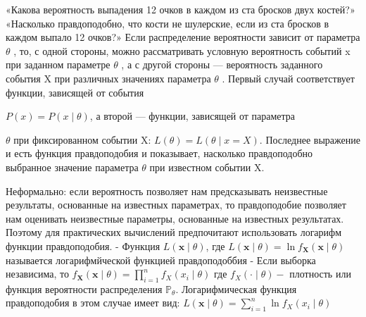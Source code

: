 \documentclass[a4paper, 12pt]{article}
\begin{document}
	«Какова вероятность выпадения 12 очков в каждом из ста бросков двух костей?»
	«Насколько правдоподобно, что кости не шулерские, если из ста бросков в каждом выпало 12 очков?»
	Если распределение вероятности зависит от параметра 
	$\theta$ , то, с одной стороны, можно рассматривать условную вероятность событий 
	x при заданном параметре
	$\theta$ , а с другой стороны — вероятность заданного события 
	X при различных значениях параметра 
	$\theta$ . Первый случай соответствует функции, зависящей от события 

$P(x)=P(x\mid \theta )$, а второй — функции, зависящей от параметра 

	$\theta$ при фиксированном событии X:
	$L(\theta )=L(\theta \mid x=X)$. Последнее выражение и есть функция правдоподобия и показывает, насколько правдоподобно выбранное значение параметра 
	$\theta$  при известном событии X.
	
	Неформально: если вероятность позволяет нам предсказывать неизвестные результаты, основанные на известных параметрах, то правдоподобие позволяет нам оценивать неизвестные параметры, основанные на известных результатах.
	Поэтому для практических вычислений предпочитают использовать логарифм функции правдоподобия.
	- Функция $L(\mathbf{x} \mid \theta)$, где
	$L(\mathbf{x} \mid \theta)=\ln f_{\mathbf{X}}(\mathbf{x} \mid \theta)$
	называется логарифмйческой функцией правдоподоббия
	- Если выборка независима, то $f_{\mathbf{X}}(\mathbf{x} \mid \theta)=\prod_{i=1}^{n} f_{X}\left(x_{i} \mid \theta\right)$
	где $f_{X}(\cdot \mid \theta)-$ плотность или функция вероятности распределения $\mathbb{P}_{\theta} .$ Логарифмическая функция правдоподобия в этом случае имеет вид:
	$L(\mathbf{x} \mid \theta)=\sum_{i=1}^{n} \ln f_{X}\left(x_{i} \mid \theta\right)$
\end{document}
